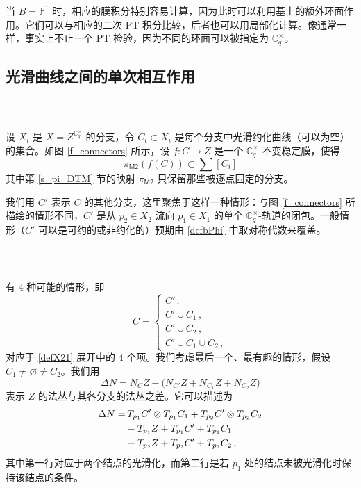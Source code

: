 \documentclass[12pt]{article}
\newcommand{\pP}{\mathbb{P}}
\newcommand{\Ct}{\mathbb{C}^{\times}}
\newcommand{\Cq}{\Ct_q}
\newcommand{\MM}{\textsf{M2}}
\theoremstyle{definition}
\begin{document}
\subsubsection{\ }
当 $B=\pP^1$ 时，相应的膜积分特别容易计算，因为此时可以利用基上的额外环面作用。它们可以与相应的二次 PT 积分比较，后者也可以用局部化计算。像通常一样，事实上不止一个 PT 检验，因为不同的环面可以被指定为 $\Cq$。

\subsection{光滑曲线之间的单次相互作用}

\subsubsection{\ }
设 $X_i$ 是 $X=Z^{\Cq}$ 的分支，令 $C_i \subset X_i$ 是每个分支中光滑约化曲线（可以为空）的集合。如图 \ref{f_connectors} 所示，设 $f: C \to Z$ 是一个 $\Cq$-不变稳定膜，使得
$$
\pi_{\MM} (f(C)) \subset \sum \left[C_i\right]
$$
其中第 \ref{s_pi_DTM} 节的映射 $\pi_{\MM}$ 只保留那些被逐点固定的分支。

我们用 $C'$ 表示 $C$ 的其他分支，这里聚焦于这样一种情形：与图 \ref{f_connectors} 所描绘的情形不同，$C'$ 是从 $p_2 \in X_2$ 流向 $p_1\in X_1$ 的单个 $\Cq$-轨道的闭包。一般情形（$C'$ 可以是可约的或非约化的）预期由 \eqref{defbPhi} 中取对称代数来覆盖。

\subsubsection{\ }
有 $4$ 种可能的情形，即
$$
C =
\begin{cases}
C' \,, \\
C' \cup C_1 \,, \\
C' \cup C_2 \,, \\
C' \cup C_1 \cup C_2 \,,
\end{cases}
$$
对应于 \eqref{defX21} 展开中的 $4$ 个项。我们考虑最后一个、最有趣的情形，假设 $C_1 \ne
\varnothing \ne C_2$。我们用
$$
\Delta N =   N_CZ  - \big(N_{C'}Z + N_{C_1}Z + N_{C_2}Z \big)
$$
表示 $Z$ 的法丛与其各分支的法丛之差。它可以描述为
\begin{align}
\Delta N =  & \,
 T_{p_1} C' \otimes T_{p_1} C_1  + T_{p_2} C' \otimes T_{p_2} C_2
\notag \\
& - T_{p_1} Z + T_{p_1} C' + T_{p_1} C_1 \notag \\
& - T_{p_2} Z + T_{p_2} C' + T_{p_2} C_2 \label{NNC} \,,
\end{align}
其中第一行对应于两个结点的光滑化，而第二行是若 $p_1$ 处的结点未被光滑化时保持该结点的条件。
\end{document}
